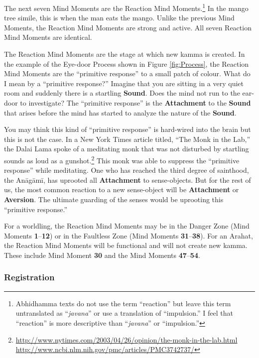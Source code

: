 The next seven Mind Moments are the Reaction Mind Moments.\footnote{Abhidhamma texts do not use the term “reaction” but leave this term untranslated as “\textit{javana}” or use a translation of “impulsion.” I feel that “reaction” is more descriptive than “\textit{javana}” or “impulsion.”} In the mango tree simile, this is when the man eats the mango. Unlike the previous Mind Moments, the Reaction Mind Moments are strong and active. All seven Reaction Mind Moments are identical.

The Reaction Mind Moments are the stage at which new kamma is created. In the example of the Eye-door Process shown in Figure \ref{fig:Process}, the Reaction Mind Moments are the “primitive response” to a small patch of colour. What do I mean by a “primitive response?” Imagine that you are sitting in a very quiet room and suddenly there is a startling \textbf{Sound}. Does the mind not run to the ear-door to investigate? The “primitive response” is the \textbf{Attachment} to the \textbf{Sound} that arises before the mind has started to analyze the nature of the \textbf{Sound}.

You may think this kind of “primitive response” is hard-wired into the brain but this is not the case. In a New York Times article titled, “The Monk in the Lab,” the Dalai Lama spoke of a meditating monk that was not disturbed by startling sounds as loud as a gunshot.\footnote{\url{http://www.nytimes.com/2003/04/26/opinion/the-monk-in-the-lab.html} \\ \url{http://www.ncbi.nlm.nih.gov/pmc/articles/PMC3742737/}} This monk was able to suppress the “primitive response” while meditating. One who has reached the third degree of sainthood, the Anāgāmī, has uprooted all \textbf{Attachment} to sense-objects. But for the rest of us, the most common reaction to a new sense-object will be \textbf{Attachment} or \textbf{Aversion}. The ultimate guarding of the senses would be uprooting this “primitive response.”

For a worldling, the Reaction Mind Moments may be in the Danger Zone (Mind Moments \textbf{1}--\textbf{12}) or in the Faultless Zone (Mind Moments \textbf{31}--\textbf{38}). For an Arahat, the Reaction Mind Moments will be functional and will not create new kamma. These include Mind Moment \textbf{30} and the Mind Moments \textbf{47}--\textbf{54}.

\subsubsection*{Registration}

